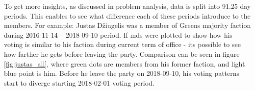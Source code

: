 \documentclass[a4paper,12pt]{article}
\begin{document}
   	To get more insights, as discussed in problem analysis, data is split into 91.25 day periods. This enables to see what difference each of these periods introduce to the members. For example: Justas Džiugelis was a member of Greens majority faction during 2016-11-14 – 2018-09-10 period. If \gls{mds} were plotted to show how his voting is similar to his faction during current term of office - its possible to see how farther he gets before leaving the party. Comparison can be seen in figure \ref{fig:justas_all}, where green dots are members from his former faction, and light blue point is him. Before he leave the party on 2018-09-10, his voting patterns start to diverge starting 2018-02-01 voting period.
   	
   	 	\begin{figure}[!tbp]
   		\centering
   		\hfill
   		\hfill

\end{figure}
\end{document}
